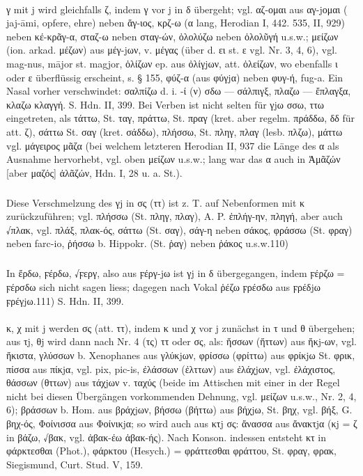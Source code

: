 \paragraph{} γ mit j wird gleichfalls ζ, indem γ vor
  j in δ übergeht; vgl. αζ-ομαι aus αγ-jομαι ( jaj-āmi, opfere, ehre) neben
  ἅγ-ιος, κρζ-ω (α lang, Herodian I, 442. 535, II, 929) neben κέ-κρᾶγ-α, σταζ-ω
  neben σταγ-ών, ὀλολύζω neben ὀλολῦγή u.s.w.; μείζων (ion. arkad. μέζων) aus
  μέγ-jων, v. μέγας (über d. ει st. ε vgl. Nr. 3, 4, 6), vgl. mag-nus, mājor st.
  magjor, ὀλίζων ep. aus ὀλίγjων, att. ὀλείζων, wo ebenfalls ι oder ε
  überflüssig erscheint, s. § 155, φύζ-α (aus φύγjα) neben φυγ-ή,  fug-a. Ein
  Nasal vorher verschwindet: σαλπίζω d. i. -ί (ν) σδω — σάλπιγξ, πλαζω —
  ἔπλαγξα, κλαζω κλαγγή. S. Hdn. II, 399. Bei Verben ist nicht selten für γjω
  σσω, ττω eingetreten, als τάττω, St. ταγ, πράττω, St. πραγ (kret. aber regelm.
  πράδδω, δδ für att. ζ), σάττω St. σαγ (kret. σάδδω), πλήσσω, St. πληγ, πλαγ
  (lesb. πλζω), μάττω vgl. μάγειρος μᾶζα (bei welchem letzteren Herodian II, 937
  die Länge des α als Ausnahme hervorhebt, vgl. oben μείζων u.s.w.; lang war
das α auch in Ἀμᾶζών [aber μαζός] ἀλᾶζών, Hdn. I, 28 u. a. St.). 

{\small\noindent\subparagraph{} Diese Verschmelzung des γj in σς (ττ) ist z. T.
  auf Nebenformen mit κ zurückzuführen; vgl. πλήσσω (St. πληγ, πλαγ), A. P.
  ἐπλήγ-ην, πληγή, aber auch √πλακ, vgl. πλάξ, πλακ-ός, σάττω (St. σαγ),
  σάγ-η neben σάκος, φράσσω (St. φραγ) neben  farc-io, ῥήσσω b. Hippokr. (St.
ῥαγ) neben ῥάκος u.s.w.110) }

{\small\noindent\subparagraph{} In ἔρδω, ϝέρδω, √ϝεργ, also aus ϝέργ-jω
  ist γj in δ übergegangen, indem ϝέρζω = ϝέρσδω sich nicht sagen liess; dagegen
nach Vokal ῥέζω ϝρέσδω aus ϝρέδjω ϝρέγjω.111) S. Hdn. II, 399.}

\paragraph{} κ, χ mit j
  werden σς (att.  ττ), indem κ und χ vor j zunächst in τ und θ übergehen;
  aus τj, θj wird dann nach Nr. 4 (τς) ττ oder σς, als: ἥσσων (ἥττων) aus
  ἥκj-ων, vgl. ἥκιστα, γλύσσων b. Xenophanes aus γλύκjων, φρίσσω (φρίττω) aus
  φρίκjω St. φρικ, πίσσα aus πίκjα, vgl. pix, pic-is, ἐλάσσων (ἐλττων) aus
  ἐλάχjων, vgl. ἐλάχιστος, θάσσων (θττων) aus τάχjων v. ταχύς (beide im
  Attischen mit einer in der Regel nicht bei diesen Übergängen vorkommenden
  Dehnung, vgl. μείζων u.s.w., Nr. 2, 4, 6); βράσσων b. Hom. aus βράχjων,
  βήσσω (βήττω) aus βήχjω, St. βηχ, vgl. βήξ, G. βηχ-ός, Φοίνισσα aus Φοίνικjα;
  so wird auch aus κτj σς: ἄνασσα aus ἄνακτjα (κj = ζ in βάζω, √βακ, vgl.
  ἀβακ-έω ἀβακ-ής). Nach Konson. indessen entsteht κτ in φάρκτεσθαι (Phot.),
  φάρκτου (Hesych.) = φράττεσθαι φράττου, St. φραγ, φρακ, Siegismund, Curt.
  Stud. V, 159. 

